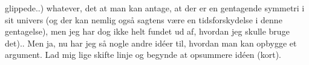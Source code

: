 \documentclass{report}
\begin{document}
glippede..) whatever, det at man kan antage, at der er en gentagende symmetri i sit univers (og der kan nemlig også sagtens være en tidsforskydelse i denne gentagelse), men jeg har dog ikke helt fundet ud af, hvordan jeg skulle bruge det).. Men ja, nu har jeg så nogle andre idéer til, hvordan man kan opbygge et argument. Lad mig lige skifte linje og begynde at opsummere idéen (kort).
\end{document}
